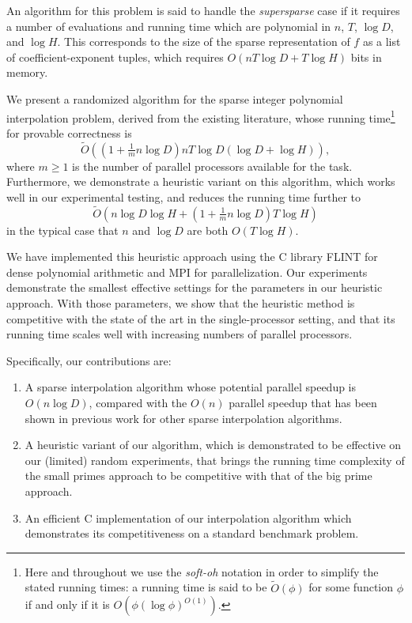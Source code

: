\documentclass[letterpaper,10pt]{article}
\newcommand{\softoh}{\ensuremath{\widetilde{O}}}
\begin{document}
An algorithm for this problem is said to handle the \emph{supersparse} case
if it requires a number of evaluations and running time which are
polynomial in $n$, $T$, $\log D$, and $\log H$. This corresponds to the size of
the sparse representation of $f$ as a list of coefficient-exponent
tuples, which requires
$O(nT\log D + T\log H)$
bits in memory.

We present a randomized algorithm for the sparse integer polynomial
interpolation problem, derived from the existing literature, whose
running time\footnote{
  Here and throughout we use the \emph{soft-oh} notation in order to
  simplify the stated running times: a running time is said to be 
  $\softoh(\phi)$ for some function $\phi$ if and only if it is
  $O(\phi (\log \phi)^{O(1)})$.
} for provable correctness is
\begin{equation}\label{eqn:rtg}
\softoh\left(
\left(1 + \tfrac{1}{m}n\log D\right)
n T \log D (\log D +\log H)\right),
\end{equation}
where $m \ge 1$ is the number of parallel processors available for the
task. Furthermore, we demonstrate a heuristic variant on this algorithm,
which works well in our experimental testing, and reduces the running
time further to
\begin{equation}\label{eqn:rth}
\softoh\left(
  n\log D\log H
  + \left(1 + \tfrac{1}{m}n\log D\right) T \log H
  \right)
\end{equation}
in the typical case that $n$ and $\log D$ are both $O(T\log H)$.

We have implemented this heuristic approach using the C library FLINT
for dense polynomial arithmetic and MPI for parallelization. Our
experiments demonstrate the smallest effective settings for the
parameters in our heuristic approach. With those parameters, we show
that the heuristic method is competitive with the state of the art in
the single-processor setting, and that its running
time scales well with increasing numbers of parallel processors.

Specifically, our contributions are:
\begin{enumerate}
  \item A sparse interpolation algorithm whose potential parallel
    speedup is $O(n\log D)$, compared with the $O(n)$ parallel speedup
    that has been shown in previous work for other sparse interpolation algorithms.
  \item A heuristic variant of our algorithm, which is demonstrated to
    be effective
    on our (limited) random experiments, that brings the
    running time complexity of the small primes approach to be
    competitive with that of the big prime approach.
  \item An efficient C implementation of our interpolation algorithm
    which demonstrates its competitiveness on a standard benchmark
    problem.
\end{enumerate}
\end{document}
